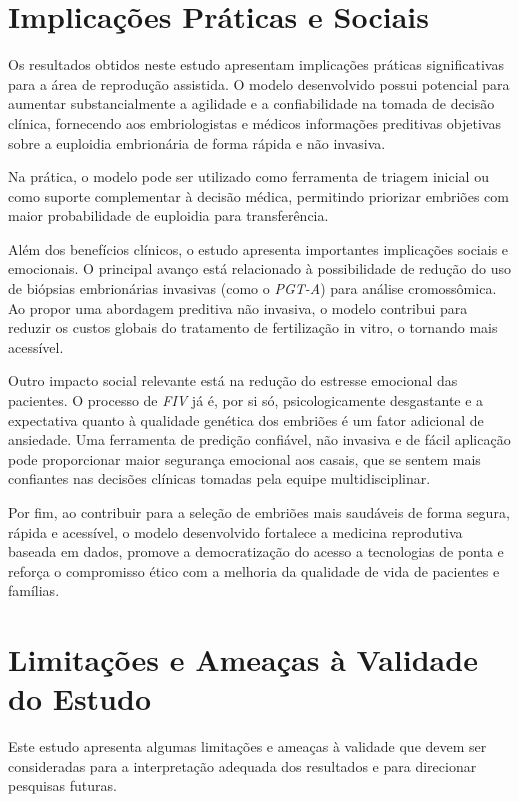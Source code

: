 \section{Implicações Práticas e Sociais}
Os resultados obtidos neste estudo apresentam implicações práticas significativas para a área de reprodução assistida. O modelo desenvolvido possui potencial para aumentar substancialmente a agilidade e a confiabilidade na tomada de decisão clínica, fornecendo aos embriologistas e médicos informações preditivas objetivas sobre a euploidia embrionária de forma rápida e não invasiva.

Na prática, o modelo pode ser utilizado como ferramenta de triagem inicial ou como suporte complementar à decisão médica, permitindo priorizar embriões com maior probabilidade de euploidia para transferência.

Além dos benefícios clínicos, o estudo apresenta importantes implicações sociais e emocionais. O principal avanço está relacionado à possibilidade de redução do uso de biópsias embrionárias invasivas (como o \textit{PGT-A}) para análise cromossômica. Ao propor uma abordagem preditiva não invasiva, o modelo contribui para reduzir os custos globais do tratamento de fertilização in vitro, o tornando mais acessível.

Outro impacto social relevante está na redução do estresse emocional das pacientes. O processo de \textit{FIV} já é, por si só, psicologicamente desgastante e a expectativa quanto à qualidade genética dos embriões é um fator adicional de ansiedade. Uma ferramenta de predição confiável, não invasiva e de fácil aplicação pode proporcionar maior segurança emocional aos casais, que se sentem mais confiantes nas decisões clínicas tomadas pela equipe multidisciplinar.

Por fim, ao contribuir para a seleção de embriões mais saudáveis de forma segura, rápida e acessível, o modelo desenvolvido fortalece a medicina reprodutiva baseada em dados, promove a democratização do acesso a tecnologias de ponta e reforça o compromisso ético com a melhoria da qualidade de vida de pacientes e famílias.

\section{Limitações e Ameaças à Validade do Estudo}
Este estudo apresenta algumas limitações e ameaças à validade que devem ser consideradas para a interpretação adequada dos resultados e para direcionar pesquisas futuras.

